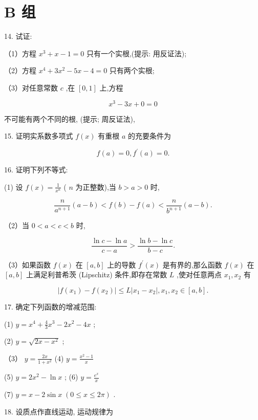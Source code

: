 \documentclass[lang=cn,newtx,12pt,scheme=chinese]{elegantbook}
\begin{document}
\section*{B 组}

14. 试证:

（1）方程 \({x}^{3} + x - 1 = 0\) 只有一个实根,(提示: 用反证法);

（2）方程 \({x}^{4} + 3{x}^{2} - {5x} - 4 = 0\) 只有两个实根;

（3）对任意常数 \(c\) ,在 \(\left\lbrack {0,1}\right\rbrack\) 上,方程

\[
{x}^{3} - {3x} + 0 = 0
\]

不可能有两个不同的根, (提示; 周反证法),

15. 证明实系数多项式 \(f\left( x\right)\) 有重根 \(a\) 的充要条件为

\[
f\left( a\right) = 0,{f}^{\prime }\left( a\right) = 0.
\]

16. 证明下列不等式:

(1) 设 \(f\left( x\right) = \frac{1}{{x}^{n}}\) ( \(n\) 为正整数),当 \(b > a > 0\) 时,

\[
\frac{n}{{a}^{n + 1}}\left( {a - b}\right) < f\left( b\right) - f\left( a\right) < \frac{n}{{b}^{n + 1}}\left( {a - b}\right) .
\]

（2）当 \(0 < a < c < b\) 时,

\[
\frac{\ln c - \ln a}{c - a} > \frac{\ln b - \ln c}{b - c}.
\]

（3）如果函数 \(f\left( x\right)\) 在 \(\left\lbrack {a,b}\right\rbrack\) 上的导数 \({f}^{\prime }\left( x\right)\) 是有界的,那么函数 \(f\left( x\right)\) 在 \(\left\lbrack {a,b}\right\rbrack\) 上满足利普希茨 (Lipschitz) 条件,即存在常数 \(L\) ,使对任意两点 \({x}_{1},{x}_{2}\) 有

\[
\left| {f\left( {x}_{1}\right) - f\left( {x}_{2}\right) }\right| \leq L\left| {{x}_{1} - {x}_{2}}\right| ,{x}_{1},{x}_{2} \in \left\lbrack {a,b}\right\rbrack .
\]

17. 确定下列函数的增减范围:

(1) \(y = {x}^{4} + \frac{4}{3}{x}^{3} - 2{x}^{2} - {4x}\) ;

(2) \(y = \sqrt{{2x} - {x}^{2}}\) ;

（3） \(y = \frac{2x}{1 + {x}^{2}}\) (4) \(y = \frac{{x}^{2} - 1}{x}\)

(5) \(y = 2{x}^{2} - \ln x\) ; (6) \(y = \frac{{e}^{x}}{x}\)

(7) \(y = x - 2\sin x\;\left( {0 \leq x \leq {2\pi }}\right)\) .

18. 设质点作直线运动, 运动规律为
\end{document}
